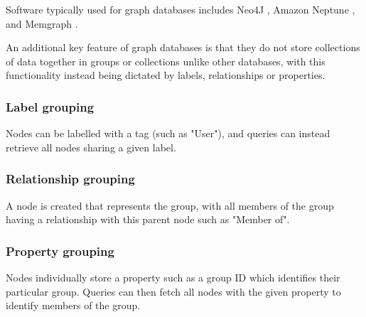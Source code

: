 \para Software typically used for graph databases includes Neo4J \autocite{neo4jNeo4jGraphDatabase2025}, Amazon 
Neptune \autocite{awsManagedGraphDatabase}, and Memgraph \autocite{memgraphMemgraphDatabase}.

\para An additional key feature of graph databases is that they do not store collections of data together in groups or collections 
unlike other databases, with this functionality instead being dictated by labels, relationships or properties. 

\subsubsection{Label grouping}
Nodes can be labelled with a tag (such as "User"), and queries can instead retrieve all nodes sharing a given label.

\subsubsection{Relationship grouping}
A node is created that represents the group, with all members of the group having a relationship with this parent node such as "Member of".

\subsubsection{Property grouping}
Nodes individually store a property such as a group ID which identifies their particular group. Queries can then fetch all nodes with the given 
property to identify members of the group.
